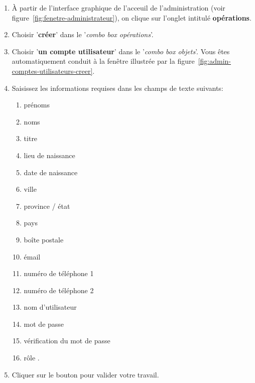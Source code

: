 \begin{enumerate}[1)]
	\item \`A partir de l'interface graphique de l'acceuil de
		l'administration (voir figure~\ref{fig:fenetre-administrateur}),
		on clique sur l'onglet intitul\'e \textbf{op\'erations}. 
		
	\item Choisir '\textbf{cr\'eer}' dans le '\emph{combo box
		op\'erations}'.
		
	\item Choisir '\textbf{un compte utilisateur}' dans
		le '\emph{combo box objets}'. Vous \^etes automatiquement
		conduit \`a la fen\^etre illustr\'ee par la
		figure~\ref{fig:admin-comptes-utilisateurs-creer}.
		
	\item Saisissez les informations requises dans les champs
		de texte suivants:
		\begin{enumerate}[1)]
			\item pr\'enoms \obligatoire
			\item noms \obligatoire
			\item titre	\obligatoire
			\item lieu de naissance 
			\item date de naissance
			\item ville
			\item province / \'etat
			\item pays
			\item bo\^ite postale
			\item \'email 
			\item num\'ero de t\'el\'ephone 1 
			\item num\'ero de t\'el\'ephone 2 
			\item nom d'utilisateur \obligatoire
			\item mot de passe \obligatoire
			\item v\'erification du mot de passe \obligatoire			
			\item r\^ole \obligatoire.
		\end{enumerate}
		
	\item Cliquer sur le bouton  pour
		valider votre travail.	
\end{enumerate}



\newpage
{}

